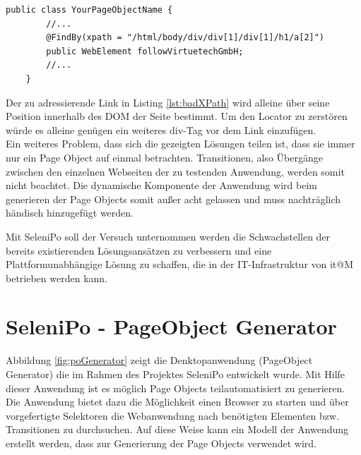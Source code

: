 \begin{lstlisting}[caption={Exportierte Testfälle},label={lst:badXPath}]
	public class YourPageObjectName {
		//...		
 		@FindBy(xpath = "/html/body/div/div[1]/div[1]/h1/a[2]")
		public WebElement followVirtuetechGmbH;	
		//...
	}
\end{lstlisting}

Der zu adressierende Link in  Listing \ref{lst:badXPath} wird alleine über seine Position innerhalb des DOM der Seite bestimmt.
Um den Locator zu zerstören würde es alleine genügen ein weiteres div-Tag vor dem Link einzufügen.
\\
Ein weiteres Problem, dass sich die gezeigten Lösungen teilen ist, dass sie immer nur ein Page Object auf einmal betrachten. Transitionen, also Übergänge zwischen den einzelnen Webseiten der zu testenden Anwendung, werden somit nicht beachtet. Die dynamische Komponente der Anwendung wird beim generieren der Page Objects somit außer acht gelassen und muss nachträglich händisch hinzugefügt werden.

Mit SeleniPo soll der Versuch unternommen werden die Schwachstellen der bereits existierenden Lösungsansätzen zu verbessern und eine Plattformunabhängige Lösung zu schaffen, die in der IT-Infrastruktur von it@M betrieben werden kann.

\newpage
\section{SeleniPo - PageObject Generator}

Abbildung \ref{fig:poGenerator} zeigt die Denktopanwendung (PageObject Generator) die im Rahmen des Projektes SeleniPo entwickelt wurde. Mit Hilfe dieser Anwendung ist es möglich Page Objects teilautomatisiert zu generieren. Die Anwendung bietet dazu die Möglichkeit einen Browser zu starten und über vorgefertigte Selektoren die Webanwendung nach benötigten Elementen bzw. Transitionen zu durchsuchen. Auf diese Weise kann ein Modell der Anwendung erstellt werden, dass zur Generierung der Page Objects verwendet wird.

